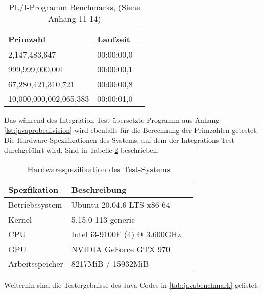 \begin{table}[h]
	\centering
	\begin{tabularx}{\textwidth}{|X|X|X|}
		\hline
		\textbf{Primzahl} & \textbf{Laufzeit}  \\
		\hline
		2,147,483,647 & 00:00:00,0 \\
		
		999,999,000,001 & 00:00:00,1  \\
		
		67,280,421,310,721 & 00:00:00,8 \\
		
		10,000,000,002,065,383 & 00:00:01,0 \\
		\hline
	\end{tabularx}
	\caption{PL/I-Programm Benchmarks, (Siehe Anhang 11-14) \label{tab:plibenchmark}}
\end{table}
\pagebreak

Das während des Integration-Test übersetzte Programm aus Anhang \ref{lst:javaprobedivision} wird ebenfalls für die Berechnung der Primzahlen 
getestet. Die Hardware-Spezifikationen des Systems, auf dem der Integrations-Test durchgeführt wird. Sind in Tabelle \ref{tab:hardwartable} beschrieben.

\begin{table}[h]
	\centering
	\begin{tabularx}{\textwidth}{|X|X|X|}
		\hline
		\textbf{Spezfikation} & \textbf{Beschreibung}  \\
		\hline
		Betriebssystem & Ubuntu 20.04.6 LTS x86 64 \\

		Kernel & 5.15.0-113-generic  \\

		CPU & Intel i3-9100F (4) @ 3.600GHz \\

		GPU & NVIDIA GeForce GTX 970  \\

		Arbeitsspeicher & 8217MiB / 15932MiB \\
		\hline
		
	\end{tabularx}
	\caption{Hardwarespezifikation des Test-Systems \label{tab:hardwartable}}
\end{table}


Weiterhin sind die Testergebnisse des Java-Codes in \ref{tab:javabenchmark} gelistet.

